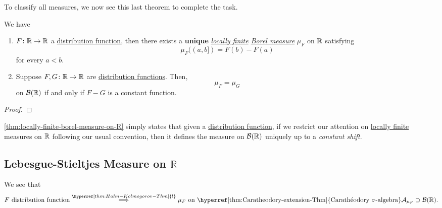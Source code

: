 To classify all measures, we now see this last theorem to complete the task.
\begin{theorem}\label{thm:locally-finite-borel-measure-on-R}
	We have
	\begin{enumerate}
		\item \(F\colon \mathbb{\MakeUppercase{r}} \to \mathbb{\MakeUppercase{r}} \) a \hyperref[def:distribution-function]{distribution function}, then there exists
		      a \textbf{unique} \emph{\hyperref[def:locally-finite]{locally finite} \hyperref[def:Borel-measure]{Borel measure}} \(\mu _F\) on \(\mathbb{\MakeUppercase{r}} \)
		      satisfying
		      \[
			      \mu _F((a, b]) = F(b) - F(a)
		      \]
		      for every \(a < b\).
		\item Suppose \(F, G\colon \mathbb{\MakeUppercase{r}} \to \mathbb{\MakeUppercase{r}} \) are \hyperref[def:distribution-function]{distribution functions}. Then,
		      \[
			      \mu _F = \mu _G
		      \]
		      on \(\mathcal{B} (\mathbb{\MakeUppercase{r}} )\) if and only if \(F-G\) is a constant function.
	\end{enumerate}
\end{theorem}
\begin{proof}
\end{proof}
\begin{remark}
	\autoref{thm:locally-finite-borel-measure-on-R} simply states that given a \hyperref[def:distribution-function]{distribution function},
	if we restrict our attention on \hyperref[def:locally-finite]{locally finite} measures on \(\mathbb{\MakeUppercase{r}} \) following our
	usual convention, then it defines the measure on \(\mathcal{B}(\mathbb{\MakeUppercase{r}} )\) uniquely up to a \emph{constant shift}.
\end{remark}

\subsection{Lebesgue-Stieltjes Measure on \(\mathbb{R} \)}
We see that
\[
	F \text{ distribution function} \overset{\hyperref[thm:Hahn-Kolmogorov-Thm]{!}}{\implies } \mu _F \text{ on \hyperref[thm:Caratheodory-extension-Thm]{Carathéodory \(\sigma\)-algebra}}\mathcal{A}_{\mu _F}\supset \mathcal{B} (\mathbb{\MakeUppercase{r}}) .
\]

